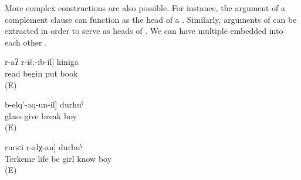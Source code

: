 More complex constructions are also possible. For instance, the argument of a complement clause can function as the head of a  . Similarly, arguments of  can be extracted in order to serve as heads of  . We can have multiple  embedded into each other . 
%
\begin{exe}
	\ex	\label{ex:the book that I (fem.) started to read}
	\gll	[du	[b-elč'-ij]	r-aʔ	r-išː-ib-il]	kiniga\\
			read	\tsc{f-}begin	put	book\\
	\glt	{} (E)

	\ex	\label{ex:the boy who broke the glass after I gave it to him}
	\gll	[[du-l	istikan	b-ičː-ib-le]	b-elq'-aq-un-il]	durħuˁ\\
			glass	give	break	boy\\
	\glt	{} (E)

	\ex	\label{ex:the boy who know the girl who lives in Terkeme}
	\gll	[[Tarkama-le-r	er	r-irχʷ-an]	rursːi	r-alχ-an]	durħuˁ\\
		Terkeme	life	be	girl	know	boy\\
	\glt	{} (E)
\end{exe}

